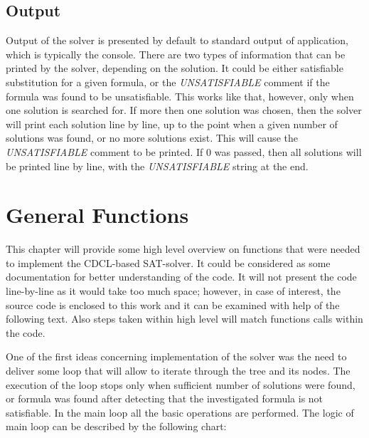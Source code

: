 \documentclass[12pt,english,pdflatex]{aghdpl}
\begin{document}
\subsection{Output}
\label{subsec:Output}

Output of the solver is presented by default to standard output of application,
which is typically  the  console. There are two types of information that can be
printed by the solver, depending on the solution. It could be either satisfiable
substitution for a given formula, or the \textit{UNSATISFIABLE} comment if the formula was
found to be unsatisfiable. This works like that, however, only when one solution is
searched for. If more then one solution was chosen, then the solver will
print each solution line by line, up to the point when a given number of solutions
was found, or no more solutions exist. This will cause the \textit{UNSATISFIABLE} comment
to be printed. If 0 was passed, then all solutions will be printed
line by line, with the \textit{UNSATISFIABLE} string at the end.


\section{General Functions}
\label{sec:General}

This chapter will provide some high level overview on functions that
were needed to implement the CDCL-based SAT-solver. It could be considered
as some documentation for better understanding of the code. It will
not present the code line-by-line as it would take too much space; however, in case of interest, the source code is enclosed to this work and it can be examined with help of the following text.
Also steps taken within high level will match functions calls within
the code.

One of the first ideas concerning implementation of the solver was the  need to deliver some loop that
will allow to iterate through the tree and its nodes. The execution of the loop stops only
when sufficient number of solutions were found, or formula was found
after detecting that the investigated formula is not satisfiable. 
In the main loop all the basic operations are performed.
The logic of main loop can be described by the following chart:
\end{document}
